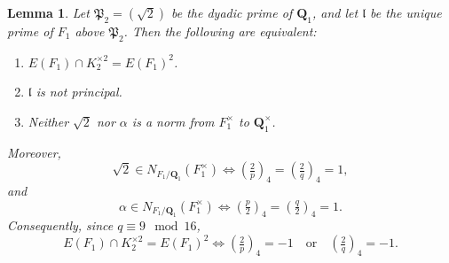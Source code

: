 \documentclass{article}
\numberwithin{equation}{section}
\theoremstyle{plain}  %
\newtheorem{lemma}{Lemma}[section]
\theoremstyle{definition}
\newcommand{\kron}[2]{\left( \tfrac{#1}{#2} \right)}
\newcommand{\fk}{\mathfrak }
\begin{document}
\begin{lemma}\label{lem:F1-no-new-squares-criterion}
Let $\fk P_2=(\sqrt 2)$ be the dyadic prime of $\mathbf Q_1$, and let $\fk l$ be the unique prime of $F_1$ above $\fk P_2$. Then the following are equivalent:
\begin{enumerate}
\item $E(F_1) \cap K_2^{\times 2}=E(F_1)^2$.
\item $\fk l$ is not principal.
\item Neither $\sqrt 2$ nor $\alpha$ is a norm from $F_1^\times$ to $\mathbf Q_1^\times$.
\end{enumerate}
Moreover,
$$
\sqrt 2 \in N_{F_1/\mathbf Q_1}(F_1^\times) \iff \kron{2}{p}_4=\kron{2}{q}_4=1,
$$
and
$$
\alpha \in N_{F_1/\mathbf Q_1}(F_1^\times) \iff \kron{p}{2}_4=\kron{q}{2}_4=1.
$$
Consequently, since $q \equiv 9 \mod {16}$,
$$
E(F_1) \cap K_2^{\times 2}=E(F_1)^2 \iff \kron{2}{p}_4=-1 \quad \text{or} \quad \kron{2}{q}_4=-1.
$$
\end{lemma}
\end{document}
